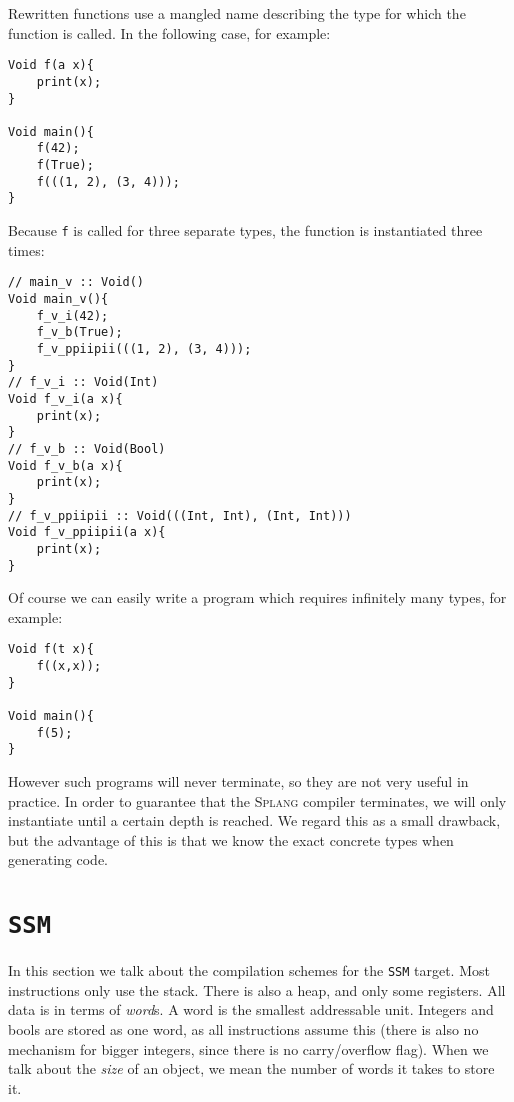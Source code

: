 \documentclass[11pt]{amsart}
\newcommand{\ssm}{\texttt{SSM}\xspace}
\newcommand{\splang}{\textsc{Splang}\xspace}
\begin{document}
Rewritten functions use a mangled name describing the type for which the function is called. In the following case, for example:

\begin{lstlisting}[language=spl]
Void f(a x){
	print(x);
}

Void main(){
	f(42);
	f(True);
	f(((1, 2), (3, 4)));
}
\end{lstlisting}

Because \texttt{f} is called for three separate types, the function is instantiated three times:

\begin{lstlisting}[language=spl]
// main_v :: Void()
Void main_v(){
	f_v_i(42);
	f_v_b(True);
	f_v_ppiipii(((1, 2), (3, 4)));
}
// f_v_i :: Void(Int)
Void f_v_i(a x){
	print(x);
}
// f_v_b :: Void(Bool)
Void f_v_b(a x){
	print(x);
}
// f_v_ppiipii :: Void(((Int, Int), (Int, Int)))
Void f_v_ppiipii(a x){
	print(x);
}
\end{lstlisting}

Of course we can easily write a program which requires infinitely many types, for example:

\begin{lstlisting}[language=spl]
Void f(t x){
	f((x,x));
}

Void main(){
	f(5);
}
\end{lstlisting}

However such programs will never terminate, so they are not very useful in practice. In order to guarantee that the \splang compiler terminates, we will only instantiate until a certain depth is reached. We regard this as a small drawback, but the advantage of this is that we know the exact concrete types when generating code.

\section{\ssm}

In this section we talk about the compilation schemes for the \ssm target. Most instructions only use the stack. There is also a heap, and only some registers. All data is in terms of \emph{word}s. A word is the smallest addressable unit. Integers and bools are stored as one word, as all instructions assume this (there is also no mechanism for bigger integers, since there is no carry/overflow flag).
When we talk about the \emph{size} of an object, we mean the number of words it takes to store it.
\end{document}
